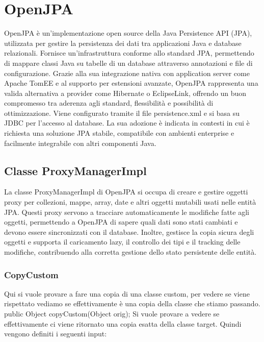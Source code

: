 \documentclass[10pt]{article}
\begin{document}
{		
		\newpage
		\section{OpenJPA}
		OpenJPA è un'implementazione open source della Java Persistence API (JPA), utilizzata per gestire la persistenza dei dati tra applicazioni Java e database relazionali. Fornisce un'infrastruttura conforme allo standard JPA, permettendo di mappare classi Java su tabelle di un database attraverso annotazioni e file di configurazione. Grazie alla sua integrazione nativa con application server come Apache TomEE e al supporto per estensioni avanzate, OpenJPA rappresenta una valida alternativa a provider come Hibernate o EclipseLink, offrendo un buon compromesso tra aderenza agli standard, flessibilità e possibilità di ottimizzazione. Viene configurato tramite il file persistence.xml e si basa su JDBC per l'accesso al database. La sua adozione è indicata in contesti in cui è richiesta una soluzione JPA stabile, compatibile con ambienti enterprise e facilmente integrabile con altri componenti Java.
		\subsection{Classe ProxyManagerImpl}
		La classe ProxyManagerImpl di OpenJPA si occupa di creare e gestire oggetti proxy per collezioni, mappe, array, date e altri oggetti mutabili usati nelle entità JPA. Questi proxy servono a tracciare automaticamente le modifiche fatte agli oggetti, permettendo a OpenJPA di sapere quali dati sono stati cambiati e devono essere sincronizzati con il database. Inoltre, gestisce la copia sicura degli oggetti e supporta il caricamento lazy, il controllo dei tipi e il tracking delle modifiche, contribuendo alla corretta gestione dello stato persistente delle entità.
		\subsubsection{CopyCustom}
		Qui si vuole provare a fare una copia di una classe custom, per vedere se viene rispettato vediamo se effettivamente è una copia della classe che stiamo passando.
		public Object copyCustom(Object orig);
		Si vuole provare a vedere se effettivamente ci viene ritornato una copia esatta della classe target.
		Quindi vengono definiti i seguenti input:
		
}
\end{document}
